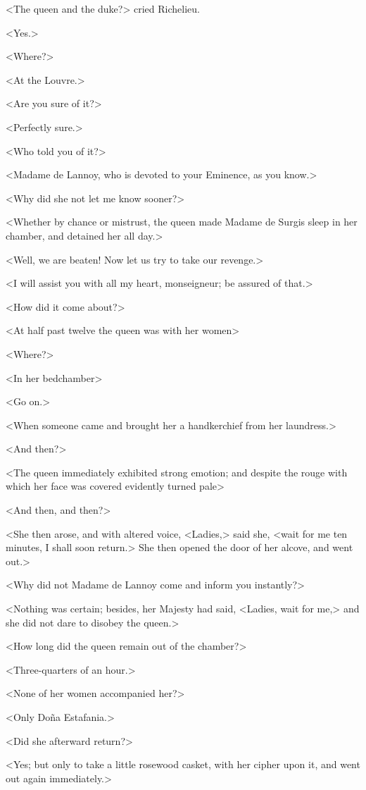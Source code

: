 <The queen and the duke?> cried Richelieu. 

<Yes.> 

<Where?> 

<At the Louvre.> 

<Are you sure of it?> 

<Perfectly sure.> 

<Who told you of it?> 

<Madame de Lannoy, who is devoted to your Eminence, as you know.> 

<Why did she not let me know sooner?> 

<Whether by chance or mistrust, the queen made Madame de Surgis sleep in her chamber, and detained her all day.> 

<Well, we are beaten! Now let us try to take our revenge.> 

<I will assist you with all my heart, monseigneur; be assured of that.> 

<How did it come about?> 

<At half past twelve the queen was with her women\longdash> 

<Where?> 

<In her bedchamber\longdash> 

<Go on.> 

<When someone came and brought her a handkerchief from her laundress.> 

<And then?> 

<The queen immediately exhibited strong emotion; and despite the rouge with which her face was covered evidently turned pale\longdash> 

<And then, and then?> 

<She then arose, and with altered voice, <Ladies,> said she, <wait for me ten minutes, I shall soon return.> She then opened the door of her alcove, and went out.> 

<Why did not Madame de Lannoy come and inform you instantly?> 

<Nothing was certain; besides, her Majesty had said, <Ladies, wait for me,> and she did not dare to disobey the queen.> 

<How long did the queen remain out of the chamber?> 

<Three-quarters of an hour.> 

<None of her women accompanied her?> 

<Only Doña Estafania.> 

<Did she afterward return?> 

<Yes; but only to take a little rosewood casket, with her cipher upon it, and went out again immediately.> 


